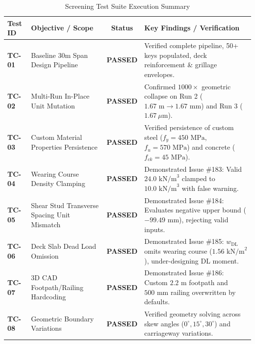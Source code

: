 \documentclass[11pt,a4paper]{article}
\begin{document}
\begin{table}[h!]
\centering
\small
\caption{Screening Test Suite Execution Summary}
\begin{tabularx}{\linewidth}{l p{5.5cm} c p{6.5cm}}
\toprule
\textbf{Test ID} & \textbf{Objective / Scope} & \textbf{Status} & \textbf{Key Findings / Verification} \\
\midrule
\textbf{TC-01} & Baseline 30m Span Design Pipeline & \textcolor{passgreen}{\textbf{PASSED}} & Verified complete pipeline, 50+ keys populated, deck reinforcement \& grillage envelopes. \\
\textbf{TC-02} & Multi-Run In-Place Unit Mutation & \textcolor{passgreen}{\textbf{PASSED}} & Confirmed $1000\times$ geometric collapse on Run 2 ($1.67\text{ m} \to 1.67\text{ mm}$) and Run 3 ($1.67\ \mu\text{m}$). \\
\textbf{TC-03} & Custom Material Properties Persistence & \textcolor{passgreen}{\textbf{PASSED}} & Verified persistence of custom steel ($f_y=450\text{ MPa}$, $f_u=570\text{ MPa}$) and concrete ($f_{ck}=45\text{ MPa}$). \\
\textbf{TC-04} & Wearing Course Density Clamping & \textcolor{passgreen}{\textbf{PASSED}} & Demonstrated Issue \#183: Valid $24.0\text{ kN/m}^3$ clamped to $10.0\text{ kN/m}^3$ with false warning. \\
\textbf{TC-05} & Shear Stud Transverse Spacing Unit Mismatch & \textcolor{passgreen}{\textbf{PASSED}} & Demonstrated Issue \#184: Evaluates negative upper bound ($-99.49\text{ mm}$), rejecting valid inputs. \\
\textbf{TC-06} & Deck Slab Dead Load Omission & \textcolor{passgreen}{\textbf{PASSED}} & Demonstrated Issue \#185: $w_{\text{DL}}$ omits wearing course ($1.56\text{ kN/m}^2$), under-designing DL moment. \\
\textbf{TC-07} & 3D CAD Footpath/Railing Hardcoding & \textcolor{passgreen}{\textbf{PASSED}} & Demonstrated Issue \#186: Custom $2.2\text{ m}$ footpath and $500\text{ mm}$ railing overwritten by defaults. \\
\textbf{TC-08} & Geometric Boundary Variations & \textcolor{passgreen}{\textbf{PASSED}} & Verified geometry solving across skew angles ($0^\circ, 15^\circ, 30^\circ$) and carriageway variations. \\
\bottomrule
\end{tabularx}
\end{table}
\end{document}
